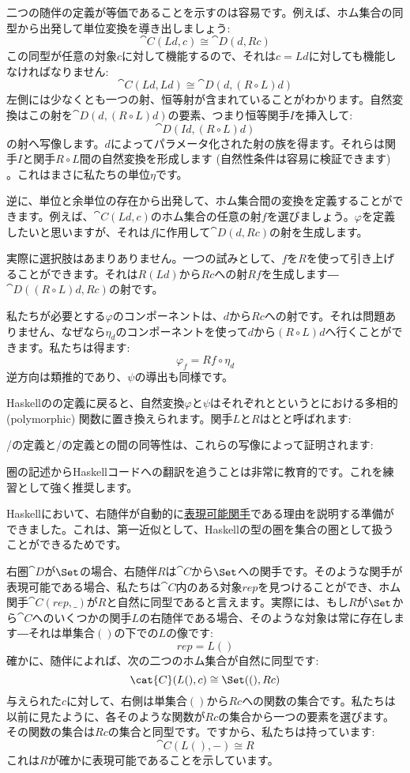 二つの随伴の定義が等価であることを示すのは容易です。例えば、ホム集合の同型から出発して単位変換を導き出しましょう: 
\[\cat{C}(L d, c) \cong \cat{D}(d, R c)\]
この同型が任意の対象$c$に対して機能するので、それは$c = L d$に対しても機能しなければなりません: 
\[\cat{C}(L d, L d) \cong \cat{D}(d, (R \circ L) d)\]
左側には少なくとも一つの射、恒等射が含まれていることがわかります。自然変換はこの射を$\cat{D}(d, (R \circ L) d)$の要素、つまり恒等関手$I$を挿入して: 
\[\cat{D}(I d, (R \circ L) d)\]
の射へ写像します。$d$によってパラメータ化された射の族を得ます。それらは関手$I$と関手$R \circ L$間の自然変換を形成します (自然性条件は容易に検証できます) 。これはまさに私たちの単位$\eta$です。

逆に、単位と余単位の存在から出発して、ホム集合間の変換を定義することができます。例えば、$\cat{C}(L d, c)$のホム集合の任意の射$f$を選びましょう。$\varphi$を定義したいと思いますが、それは$f$に作用して$\cat{D}(d, R c)$の射を生成します。

実際に選択肢はあまりありません。一つの試みとして、$f$を$R$を使って引き上げることができます。それは$R (L d)$から$R c$への射$R f$を生成します―$\cat{D}((R \circ L) d, R c)$の射です。

私たちが必要とする$\varphi$のコンポーネントは、$d$から$R c$への射です。それは問題ありません、なぜなら$\eta_d$のコンポーネントを使って$d$から$(R \circ L) d$へ行くことができます。私たちは得ます: 
\[\varphi_f = R f \circ \eta_d\]
逆方向は類推的であり、$\psi$の導出も同様です。

Haskellのの定義に戻ると、自然変換$\varphi$と$\psi$はそれぞれとというとにおける多相的 (polymorphic) 関数に置き換えられます。関手$L$と$R$はとと呼ばれます: 

/の定義と/の定義との間の同等性は、これらの写像によって証明されます: 

圏の記述からHaskellコードへの翻訳を追うことは非常に教育的です。これを練習として強く推奨します。

Haskellにおいて、右随伴が自動的に\hyperref[representable-functors]{表現可能関手}である理由を説明する準備ができました。これは、第一近似として、Haskellの型の圏を集合の圏として扱うことができるためです。

右圏$\cat{D}$が$\Set$の場合、右随伴$R$は$\cat{C}$から$\Set$への関手です。そのような関手が表現可能である場合、私たちは$\cat{C}$内のある対象$\mathit{rep}$を見つけることができ、ホム関手$\cat{C}(\mathit{rep}, \_)$が$R$と自然に同型であると言えます。実際には、もし$R$が$\Set$から$\cat{C}$へのいくつかの関手$L$の右随伴である場合、そのような対象は常に存在します―それは単集合$()$の下での$L$の像です: 
\[\mathit{rep} = L ()\]
確かに、随伴によれば、次の二つのホム集合が自然に同型です: 
\[\cat{C}(L (), c) \cong \Set((), R c)\]
与えられた$c$に対して、右側は単集合$()$から$R c$への関数の集合です。私たちは以前に見たように、各そのような関数が$R c$の集合から一つの要素を選びます。その関数の集合は$R c$の集合と同型です。ですから、私たちは持っています: 
\[\cat{C}(L (), -) \cong R\]
これは$R$が確かに表現可能であることを示しています。

